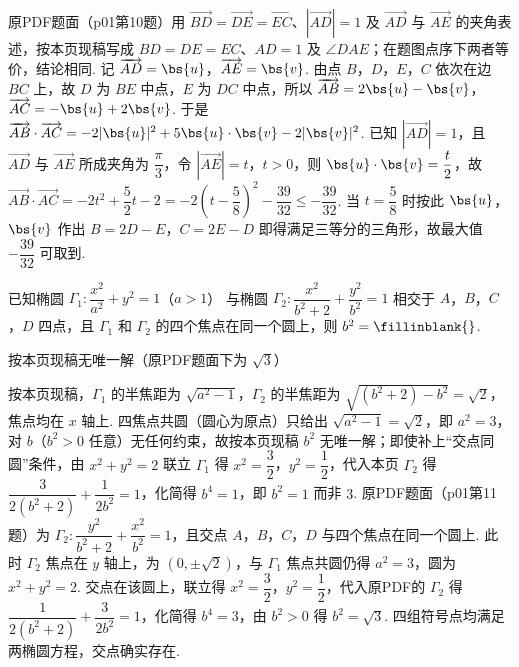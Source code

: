 \documentclass[UTF8,a4paper,oneside,11pt]{ctexbook}
\begin{document}
\begin{solution}
原PDF题面（p01第10题）用 \(\overrightarrow{BD}=\overrightarrow{DE}=\overrightarrow{EC}\)、\(\left|\overrightarrow{AD}\right|=1\) 及 \(\overrightarrow{AD}\) 与 \(\overrightarrow{AE}\) 的夹角表述，按本页现稿写成 \(BD=DE=EC\)、\(AD=1\) 及 \(\angle DAE\)；在题图点序下两者等价，结论相同. 记 \(\overrightarrow{AD}=\bs{u}\)，\(\overrightarrow{AE}=\bs{v}\). 由点 \(B\)，\(D\)，\(E\)，\(C\) 依次在边 \(BC\) 上，故 \(D\) 为 \(BE\) 中点，\(E\) 为 \(DC\) 中点，所以 \(\overrightarrow{AB}=2\bs{u}-\bs{v}\)，\(\overrightarrow{AC}=-\bs{u}+2\bs{v}\). 于是 \(\overrightarrow{AB}\cdot\overrightarrow{AC}=-2|\bs{u}|^2+5\bs{u}\cdot\bs{v}-2|\bs{v}|^2\). 已知 \(|\overrightarrow{AD}|=1\)，且 \(\overrightarrow{AD}\) 与 \(\overrightarrow{AE}\) 所成夹角为 \(\dfrac{\pi}{3}\)，令 \(|\overrightarrow{AE}|=t\)，\(t>0\)，则 \(\bs{u}\cdot\bs{v}=\dfrac{t}{2}\)，故 \(\overrightarrow{AB}\cdot\overrightarrow{AC}=-2t^2+\dfrac52t-2=-2\left(t-\dfrac58\right)^2-\dfrac{39}{32}\le-\dfrac{39}{32}\). 当 \(t=\dfrac58\) 时按此 \(\bs{u}\)，\(\bs{v}\) 作出 \(B=2D-E\)，\(C=2E-D\) 即得满足三等分的三角形，故最大值 \(-\dfrac{39}{32}\) 可取到.
\end{solution}

\begin{problem}
已知椭圆 \(\Gamma_1:\dfrac{x^2}{a^2}+y^2=1\)（\(a>1\)） 与椭圆 \(\Gamma_2:\dfrac{x^2}{b^2+2}+\dfrac{y^2}{b^2}=1\) 相交于 \(A\)，\(B\)，\(C\)，\(D\) 四点，且 \(\Gamma_1\) 和 \(\Gamma_2\) 的四个焦点在同一个圆上，则 \(b^2=\fillinblank{}\).
\end{problem}

\begin{answer}
按本页现稿无唯一解（原PDF题面下为 \(\sqrt{3}\)）
\end{answer}

\begin{solution}
按本页现稿，\(\Gamma_1\) 的半焦距为 \(\sqrt{a^2-1}\)，\(\Gamma_2\) 的半焦距为 \(\sqrt{\left(b^2+2\right)-b^2}=\sqrt2\)，焦点均在 \(x\) 轴上. 四焦点共圆（圆心为原点）只给出 \(\sqrt{a^2-1}=\sqrt2\)，即 \(a^2=3\)，对 \(b\)（\(b^2>0\) 任意）无任何约束，故按本页现稿 \(b^2\) 无唯一解；即使补上“交点同圆”条件，由 \(x^2+y^2=2\) 联立 \(\Gamma_1\) 得 \(x^2=\dfrac32\)，\(y^2=\dfrac12\)，代入本页 \(\Gamma_2\) 得 \(\dfrac{3}{2\left(b^2+2\right)}+\dfrac{1}{2b^2}=1\)，化简得 \(b^4=1\)，即 \(b^2=1\) 而非 \(3\). 原PDF题面（p01第11题）为 \(\Gamma_2:\dfrac{y^2}{b^2+2}+\dfrac{x^2}{b^2}=1\)，且交点 \(A\)，\(B\)，\(C\)，\(D\) 与四个焦点在同一个圆上. 此时 \(\Gamma_2\) 焦点在 \(y\) 轴上，为 \(\left(0,\pm\sqrt2\right)\)，与 \(\Gamma_1\) 焦点共圆仍得 \(a^2=3\)，圆为 \(x^2+y^2=2\). 交点在该圆上，联立得 \(x^2=\dfrac32\)，\(y^2=\dfrac12\)，代入原PDF的 \(\Gamma_2\) 得 \(\dfrac{1}{2\left(b^2+2\right)}+\dfrac{3}{2b^2}=1\)，化简得 \(b^4=3\)，由 \(b^2>0\) 得 \(b^2=\sqrt{3}\). 四组符号点均满足两椭圆方程，交点确实存在.
\end{solution}
\end{document}
